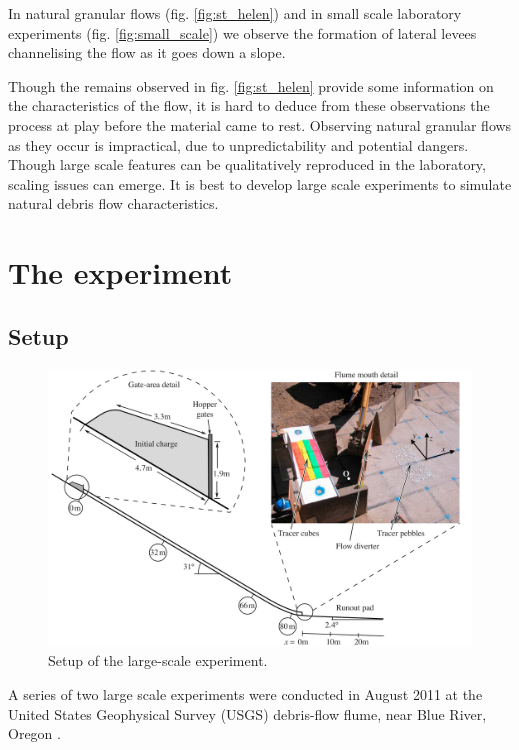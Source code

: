 In natural granular flows (fig. \ref{fig:st_helen}) and in small scale laboratory experiments (fig. \ref{fig:small_scale}) we observe the formation of lateral levees channelising the flow as it goes down a slope.

Though the remains observed in fig. \ref{fig:st_helen} provide some information on the characteristics of the flow, it is hard to deduce from these observations the process at play before the material came to rest. 
Observing natural granular flows as they occur is impractical, due to unpredictability
and potential dangers. 
Though large scale features can be qualitatively reproduced in the
laboratory, scaling issues can emerge. It is best to develop large scale experiments to simulate natural debris flow characteristics.

\section{The experiment}

\subsection{Setup}

\begin{figure}[htp]
\centering
\includegraphics[scale=0.25]{images/whole_flume.png}
\caption{Setup of the large-scale experiment.}
\label{setup}
\end{figure}

A series of two large scale experiments were conducted in August 2011 at the United States Geophysical Survey (USGS) debris-flow flume, near Blue River, Oregon \cite{main}. 

